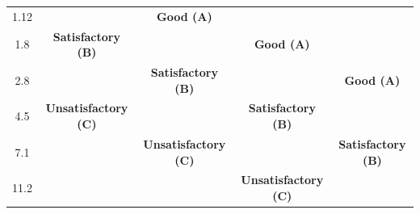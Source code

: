 \begin{table}[h]
\begin{adjustbox}{width=\columnwidth,center}
\begin{tabular}{|c|c|c|c|c|}
1.12                                                                                 & \cellcolor[HTML]{FFFC9E}                                                  & \multirow{-4}{*}{\cellcolor[HTML]{9AFF99}\textbf{Good (A)}}                 & \cellcolor[HTML]{9AFF99}                                                                     & \cellcolor[HTML]{9AFF99}                                                                      \\ \cline{1-1} \cline{3-3}
1.8                                                                                  & \multirow{-2}{*}{\cellcolor[HTML]{FFFC9E}\textbf{Satisfactory (B)}}       & \cellcolor[HTML]{FFFC9E}                                                    & \multirow{-5}{*}{\cellcolor[HTML]{9AFF99}\textbf{Good (A)}}                                  & \cellcolor[HTML]{9AFF99}                                                                      \\ \cline{1-2} \cline{4-4}
2.8                                                                                  & \cellcolor[HTML]{F8A102}                                                  & \multirow{-2}{*}{\cellcolor[HTML]{FFFC9E}\textbf{Satisfactory (B)}}         & \cellcolor[HTML]{FFFC9E}                                                                     & \multirow{-6}{*}{\cellcolor[HTML]{9AFF99}\textbf{Good (A)}}                                   \\ \cline{1-1} \cline{3-3} \cline{5-5} 
4.5                                                                                  & \multirow{-2}{*}{\cellcolor[HTML]{F8A102}\textbf{Unsatisfactory (C)}}     & \cellcolor[HTML]{F8A102}                                                    & \multirow{-2}{*}{\cellcolor[HTML]{FFFC9E}\textbf{Satisfactory (B)}}                          & \cellcolor[HTML]{FFFC9E}                                                                      \\ \cline{1-2} \cline{4-4}
7.1                                                                                  & \cellcolor[HTML]{FD6864}                                                  & \multirow{-2}{*}{\cellcolor[HTML]{F8A102}\textbf{Unsatisfactory (C)}}       & \cellcolor[HTML]{F8A102}                                                                     & \multirow{-2}{*}{\cellcolor[HTML]{FFFC9E}\textbf{Satisfactory (B)}}                           \\ \cline{1-1} \cline{3-3} \cline{5-5} 
11.2                                                                                 & \cellcolor[HTML]{FD6864}                                                  & \cellcolor[HTML]{FD6864}                                                    & \multirow{-2}{*}{\cellcolor[HTML]{F8A102}\textbf{Unsatisfactory (C)}}                        & \cellcolor[HTML]{F8A102}                                                                      \\ \cline{1-1} \cline{4-4}

\end{tabular}
\end{adjustbox}
\end{table}
